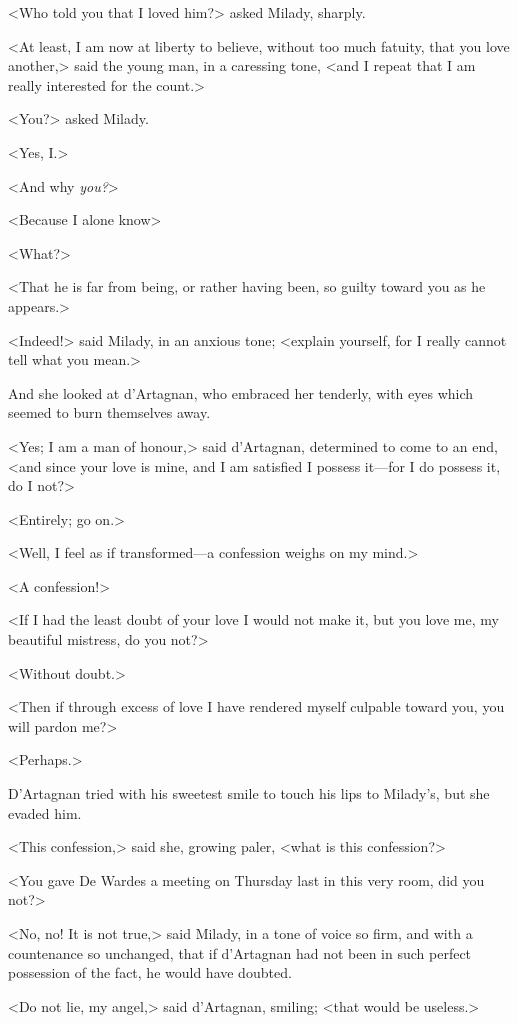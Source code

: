 <Who told you that I loved him?> asked Milady, sharply. 

<At least, I am now at liberty to believe, without too much fatuity, that you love another,> said the young man, in a caressing tone, <and I repeat that I am really interested for the count.> 

<You?> asked Milady. 

<Yes, I.> 

<And why \textit{you?}> 

<Because I alone know\longdash> 

<What?> 

<That he is far from being, or rather having been, so guilty toward you as he appears.> 

<Indeed!> said Milady, in an anxious tone; <explain yourself, for I really cannot tell what you mean.> 

And she looked at d'Artagnan, who embraced her tenderly, with eyes which seemed to burn themselves away. 

<Yes; I am a man of honour,> said d'Artagnan, determined to come to an end, <and since your love is mine, and I am satisfied I possess it---for I do possess it, do I not?> 

<Entirely; go on.> 

<Well, I feel as if transformed---a confession weighs on my mind.> 

<A confession!> 

<If I had the least doubt of your love I would not make it, but you love me, my beautiful mistress, do you not?> 

<Without doubt.> 

<Then if through excess of love I have rendered myself culpable toward you, you will pardon me?> 

<Perhaps.> 

D'Artagnan tried with his sweetest smile to touch his lips to Milady's, but she evaded him. 

<This confession,> said she, growing paler, <what is this confession?> 

<You gave De Wardes a meeting on Thursday last in this very room, did you not?> 

<No, no! It is not true,> said Milady, in a tone of voice so firm, and with a countenance so unchanged, that if d'Artagnan had not been in such perfect possession of the fact, he would have doubted. 

<Do not lie, my angel,> said d'Artagnan, smiling; <that would be useless.> 

